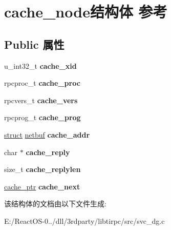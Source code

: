 \hypertarget{structcache__node}{}\section{cache\+\_\+node结构体 参考}
\label{structcache__node}
\subsection*{Public 属性}
\begin{DoxyCompactItemize}
\item 
\mbox{\label{structcache__node_a3f072eba70dcea48e25283ae953c165f}} 
u\+\_\+int32\+\_\+t {\bfseries cache\+\_\+xid}
\item 
\mbox{\label{structcache__node_a4cb1b3b17ee52dc6e330063a862532cd}} 
rpcproc\+\_\+t {\bfseries cache\+\_\+proc}
\item 
\mbox{\label{structcache__node_a1d5076ef7042f3cded8eddc569b0a7d0}} 
rpcvers\+\_\+t {\bfseries cache\+\_\+vers}
\item 
\mbox{\label{structcache__node_a41ca1bf96cbe5e6b4e78c96fd9bdfa43}} 
rpcprog\+\_\+t {\bfseries cache\+\_\+prog}
\item 
\mbox{\label{structcache__node_a2aa69109c5eb636a5066ec06449f13c3}} 
\hyperlink{interfacestruct}{struct} \hyperlink{structnetbuf}{netbuf} {\bfseries cache\+\_\+addr}
\item 
\mbox{\label{structcache__node_a157fef3c77d8dad5522d9a761f27d7de}} 
char $\ast$ {\bfseries cache\+\_\+reply}
\item 
\mbox{\label{structcache__node_a303fb6ee6d5471d91cc6929bc712d675}} 
size\+\_\+t {\bfseries cache\+\_\+replylen}
\item 
\mbox{\label{structcache__node_a78513832f32d5a7940bcf4f4d8f2f4ae}} 
\hyperlink{structcache__node}{cache\+\_\+ptr} {\bfseries cache\+\_\+next}
\end{DoxyCompactItemize}


该结构体的文档由以下文件生成\+:\begin{DoxyCompactItemize}
\item 
E\+:/\+React\+O\+S-\/0../dll/3rdparty/libtirpc/src/svc\+\_\+dg.\+c\end{DoxyCompactItemize}
